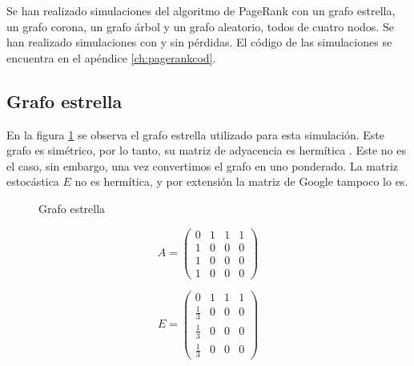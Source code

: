 Se han realizado simulaciones del algoritmo de PageRank con un grafo estrella, un grafo corona, un grafo árbol y un grafo aleatorio, todos de cuatro nodos. Se han realizado simulaciones con y sin pérdidas. El código de las simulaciones se encuentra en el apéndice \ref{ch:pagerankcod}.

\subsection{Grafo estrella}

En la figura \ref{fig:star} se observa el grafo estrella utilizado para esta simulación. Este grafo es simétrico, por lo tanto, su matriz de adyacencia es hermítica%
. Este no es el caso, sin embargo, una vez convertimos el grafo en uno ponderado. La matriz estocástica $E$ no es hermítica, y por extensión la matriz de Google tampoco lo es.

\begin{figure}[H]
    \centering
    \caption[Grafo estrella]{Grafo estrella}
    \label{fig:star}
\end{figure}

\begin{equation}
    A =
    \begin{pmatrix}
        0 & 1 & 1 & 1 \\
        1 & 0 & 0 & 0 \\
        1 & 0 & 0 & 0 \\
        1 & 0 & 0 & 0
    \end{pmatrix}
\end{equation}

\begin{equation}
    E = 
    \begin{pmatrix}
        0 & 1 & 1 & 1 \\
        \frac{1}{3} & 0 & 0 & 0 \\
        \frac{1}{3} & 0 & 0 & 0 \\
        \frac{1}{3} & 0 & 0 & 0
    \end{pmatrix}
\end{equation}

